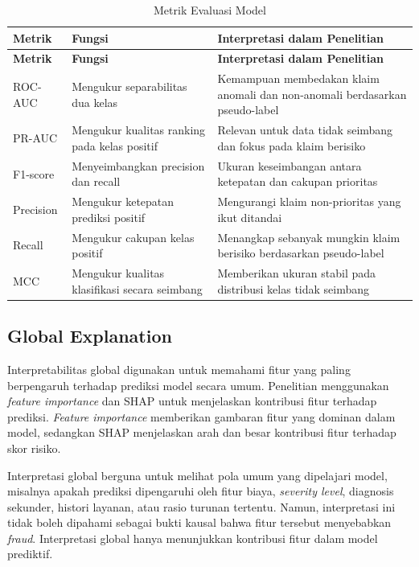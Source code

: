 \begin{longtable}[]{@{}p{}p{}p{}@{}}
\caption{Metrik Evaluasi Model}\label{tab:metrik-evaluasi-bab3}\\
\toprule
\textbf{Metrik} & \textbf{Fungsi} & \textbf{Interpretasi dalam Penelitian} \\
\midrule
\endfirsthead
\toprule
\textbf{Metrik} & \textbf{Fungsi} & \textbf{Interpretasi dalam Penelitian} \\
\midrule
\endhead
\bottomrule
\endfoot
ROC-AUC & Mengukur separabilitas dua kelas & Kemampuan membedakan klaim anomali dan non-anomali berdasarkan pseudo-label \\
PR-AUC & Mengukur kualitas ranking pada kelas positif & Relevan untuk data tidak seimbang dan fokus pada klaim berisiko \\
F1-score & Menyeimbangkan precision dan recall & Ukuran keseimbangan antara ketepatan dan cakupan prioritas \\
Precision & Mengukur ketepatan prediksi positif & Mengurangi klaim non-prioritas yang ikut ditandai \\
Recall & Mengukur cakupan kelas positif & Menangkap sebanyak mungkin klaim berisiko berdasarkan pseudo-label \\
MCC & Mengukur kualitas klasifikasi secara seimbang & Memberikan ukuran stabil pada distribusi kelas tidak seimbang \\
\end{longtable}

\subsection{Global Explanation}\label{global-explanation}

Interpretabilitas global digunakan untuk memahami fitur yang paling berpengaruh terhadap prediksi model secara umum. Penelitian menggunakan \emph{feature importance} dan SHAP untuk menjelaskan kontribusi fitur terhadap prediksi. \emph{Feature importance} memberikan gambaran fitur yang dominan dalam model, sedangkan SHAP menjelaskan arah dan besar kontribusi fitur terhadap skor risiko.

Interpretasi global berguna untuk melihat pola umum yang dipelajari model, misalnya apakah prediksi dipengaruhi oleh fitur biaya, \emph{severity level}, diagnosis sekunder, histori layanan, atau rasio turunan tertentu. Namun, interpretasi ini tidak boleh dipahami sebagai bukti kausal bahwa fitur tersebut menyebabkan \emph{fraud}. Interpretasi global hanya menunjukkan kontribusi fitur dalam model prediktif.

